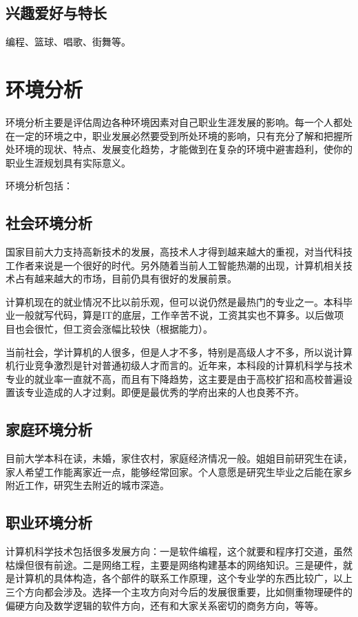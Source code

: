 \documentclass{article}
\begin{document}
\subsection{兴趣爱好与特长}
编程、篮球、唱歌、街舞等。\par
\section{环境分析}
环境分析主要是评估周边各种环境因素对自己职业生涯发展的影响。每一个人都处在一定的环境之中，职业发展必然要受到所处环境的影响，只有充分了解和把握所处环境的现状、特点、发展变化趋势，才能做到在复杂的环境中避害趋利，使你的职业生涯规划具有实际意义。\par
环境分析包括：\par
\subsection{社会环境分析}
国家目前大力支持高新技术的发展，高技术人才得到越来越大的重视，对当代科技工作者来说是一个很好的时代。另外随着当前人工智能热潮的出现，计算机相关技术占有越来越大的市场，目前仍具有很好的发展前景。

计算机现在的就业情况不比以前乐观，但可以说仍然是最热门的专业之一。本科毕业一般就写代码，算是IT的底层，工作辛苦不说，工资其实也不算多。以后做项目也会很忙，但工资会涨幅比较快（根据能力）。

当前社会，学计算机的人很多，但是人才不多，特别是高级人才不多，所以说计算机行业竞争激烈是针对普通初级人才而言的。近年来，本科段的计算机科学与技术专业的就业率一直就不高，而且有下降趋势，这主要是由于高校扩招和高校普遍设置该专业造成的人才过剩。即便是最优秀的学府出来的人也良莠不齐。\par
\subsection{家庭环境分析}
目前大学本科在读，未婚，家住农村，家庭经济情况一般。姐姐目前研究生在读，家人希望工作能离家近一点，能够经常回家。个人意愿是研究生毕业之后能在家乡附近工作，研究生去附近的城市深造。\par
\subsection{职业环境分析}
计算机科学技术包括很多发展方向：一是软件编程，这个就要和程序打交道，虽然枯燥但很有前途。二是网络工程，主要是网络构建基本的网络知识。三是硬件，就是计算机的具体构造，各个部件的联系工作原理，这个专业学的东西比较广，以上三个方向都会涉及。选择一个主攻方向对今后的发展很重要，比如侧重物理硬件的偏硬方向及数学逻辑的软件方向，还有和大家关系密切的商务方向，等等。
\end{document}
